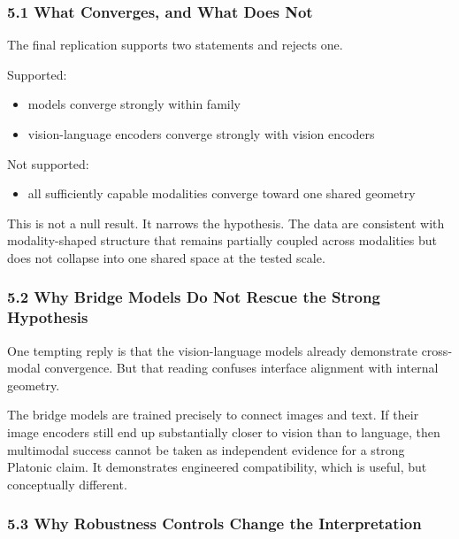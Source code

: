 \documentclass[
]{article}
\providecommand{\tightlist}{%
  \setlength{\itemsep}{0pt}\setlength{\parskip}{0pt}}
\begin{document}
\subsubsection{5.1 What Converges, and What Does
Not}\label{what-converges-and-what-does-not}

The final replication supports two statements and rejects one.

Supported:

\begin{itemize}
\tightlist
\item
  models converge strongly within family
\item
  vision-language encoders converge strongly with vision encoders
\end{itemize}

Not supported:

\begin{itemize}
\tightlist
\item
  all sufficiently capable modalities converge toward one shared
  geometry
\end{itemize}

This is not a null result. It narrows the hypothesis. The data are
consistent with modality-shaped structure that remains partially coupled
across modalities but does not collapse into one shared space at the
tested scale.

\subsubsection{5.2 Why Bridge Models Do Not Rescue the Strong
Hypothesis}\label{why-bridge-models-do-not-rescue-the-strong-hypothesis}

One tempting reply is that the vision-language models already
demonstrate cross-modal convergence. But that reading confuses interface
alignment with internal geometry.

The bridge models are trained precisely to connect images and text. If
their image encoders still end up substantially closer to vision than to
language, then multimodal success cannot be taken as independent
evidence for a strong Platonic claim. It demonstrates engineered
compatibility, which is useful, but conceptually different.

\subsubsection{5.3 Why Robustness Controls Change the
Interpretation}\label{why-robustness-controls-change-the-interpretation}
\end{document}
